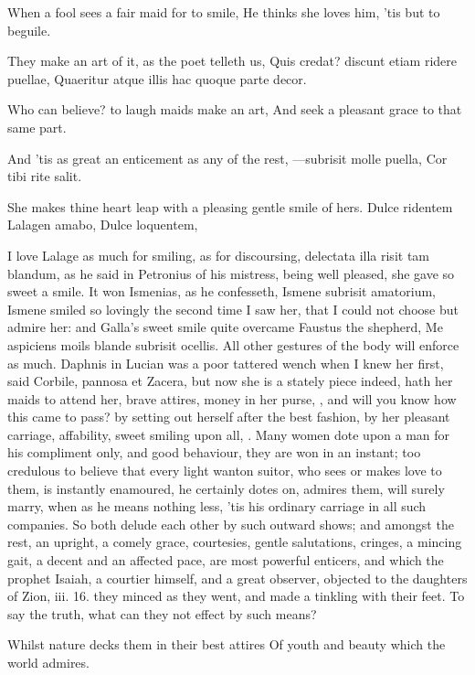 {When a fool sees a fair maid for to smile,
He thinks she loves him, 'tis but to beguile.

They make an art of it, as the poet telleth us,
Quis credat? discunt etiam ridere puellae,
Quaeritur atque illis hac quoque parte decor.

Who can believe? to laugh maids make an art,
And seek a pleasant grace to that same part.

And 'tis as great an enticement as any of the rest,
---subrisit molle puella,
Cor tibi rite salit.

She makes thine heart leap with a pleasing gentle smile of hers.
Dulce ridentem Lalagen amabo,
Dulce loquentem,

I love Lalage as much for smiling, as for discoursing, delectata illa
risit tam blandum, as he said in Petronius of his mistress, being well
pleased, she gave so sweet a smile. It won Ismenias, as he 
confesseth, Ismene subrisit amatorium, Ismene smiled so lovingly the
second time I saw her, that I could not choose but admire her: and
Galla's sweet smile quite overcame Faustus the shepherd, Me
aspiciens moils blande subrisit ocellis. All other gestures of the body
will enforce as much. Daphnis in Lucian was a poor tattered wench
when I knew her first, said Corbile, pannosa et Zacera, but now she is
a stately piece indeed, hath her maids to attend her, brave attires,
money in her purse, \etc{}, and will you know how this came to pass? by
setting out herself after the best fashion, by her pleasant carriage,
affability, sweet smiling upon all, \etc{}. Many women dote upon a man for
his compliment only, and good behaviour, they are won in an instant;
too credulous to believe that every light wanton suitor, who sees or
makes love to them, is instantly enamoured, he certainly dotes on,
admires them, will surely marry, when as he means nothing less, 'tis
his ordinary carriage in all such companies. So both delude each other
by such outward shows; and amongst the rest, an upright, a comely
grace, courtesies, gentle salutations, cringes, a mincing gait, a
decent and an affected pace, are most powerful enticers, and which the
prophet Isaiah, a courtier himself, and a great observer, objected to
the daughters of Zion, iii. 16. they minced as they went, and made a
tinkling with their feet. To say the truth, what can they not effect by
such means?

Whilst nature decks them in their best attires
Of youth and beauty which the world admires.

}
